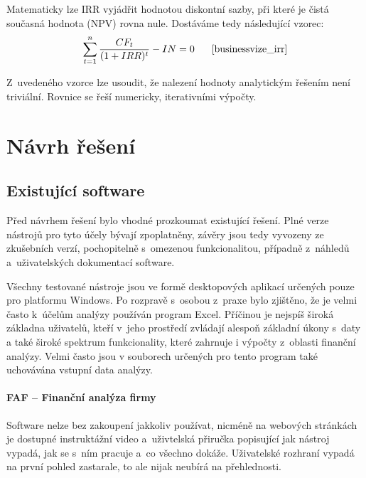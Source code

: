 Matematicky lze IRR vyjádřit hodnotou diskontní sazby, při které je čistá současná hodnota (NPV) rovna nule. Dostáváme tedy následující vzorec:
$$\sum\limits_{t=1}^{n} \dfrac{CF_t}{(1+IRR)^t} - IN = 0 \scite{businessvize_irr}$$

Z~uvedeného vzorce lze usoudit, že nalezení hodnoty analytickým řešením není triviální. Rovnice se řeší numericky, iterativními výpočty.








































\chapter{Návrh řešení}



\section{Existující software}
Před návrhem řešení bylo vhodné prozkoumat existující řešení. Plné verze nástrojů pro tyto účely bývají zpoplatněny, závěry jsou tedy vyvozeny ze zkušebních verzí, pochopitelně s~omezenou funkcionalitou, případně z~náhledů a~uživatelských dokumentací software.

Všechny testované nástroje jsou ve formě desktopových aplikací určených pouze pro platformu Windows. Po rozpravě s~osobou z~praxe bylo zjištěno, že je velmi často k~účelům analýzy používán program Excel. Příčinou je nejspíš široká základna uživatelů, kteří v~jeho prostředí zvládají alespoň základní úkony s~daty a také široké spektrum funkcionality, které zahrnuje i výpočty z~oblasti finanční analýzy. Velmi často jsou v souborech určených pro tento program také uchovávána vstupní data analýzy.

\subsubsection{FAF -- Finanční analýza firmy}
Software nelze bez zakoupení jakkoliv používat, nicméně na webových stránkách je dostupné instruktážní video a~uživtelská přiručka popisující jak nástroj vypadá, jak se s~ním pracuje a~co všechno dokáže. Uživatelské rozhraní vypadá na první pohled zastarale, to ale nijak neubírá na přehlednosti.

